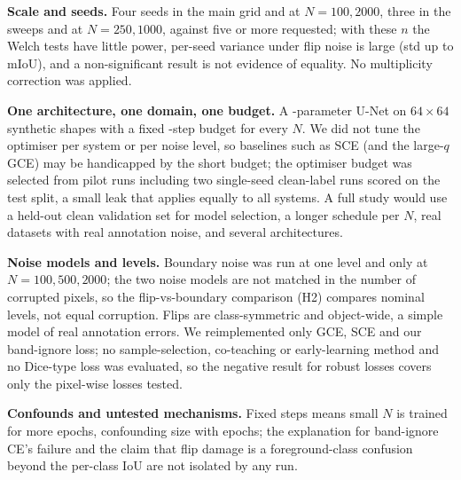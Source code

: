 \textbf{Scale and seeds.} Four seeds in the main grid and at $N=100,2000$, three in the sweeps and at $N=250,1000$, against five or more requested; with these $n$ the Welch tests have little power, per-seed variance under flip noise is large (std up to  mIoU), and a non-significant result is not evidence of equality. No multiplicity correction was applied.

\textbf{One architecture, one domain, one budget.} A -parameter U-Net on $64\times64$ synthetic shapes with a fixed -step budget for every $N$. We did not tune the optimiser per system or per noise level, so baselines such as SCE (and the large-$q$ GCE) may be handicapped by the short budget; the optimiser budget was selected from pilot runs including two single-seed clean-label runs scored on the test split, a small leak that applies equally to all systems. A full study would use a held-out clean validation set for model selection, a longer schedule per $N$, real datasets with real annotation noise, and several architectures.

\textbf{Noise models and levels.} Boundary noise was run at one level and only at $N=100,500,2000$; the two noise models are not matched in the number of corrupted pixels, so the flip-vs-boundary comparison (H2) compares nominal levels, not equal corruption. Flips are class-symmetric and object-wide, a simple model of real annotation errors. We reimplemented only GCE, SCE and our band-ignore loss; no sample-selection, co-teaching or early-learning method and no Dice-type loss was evaluated, so the negative result for robust losses covers only the pixel-wise losses tested.

\textbf{Confounds and untested mechanisms.} Fixed steps means small $N$ is trained for more epochs, confounding size with epochs; the explanation for band-ignore CE's failure and the claim that flip damage is a foreground-class confusion beyond the per-class IoU are not isolated by any run.
